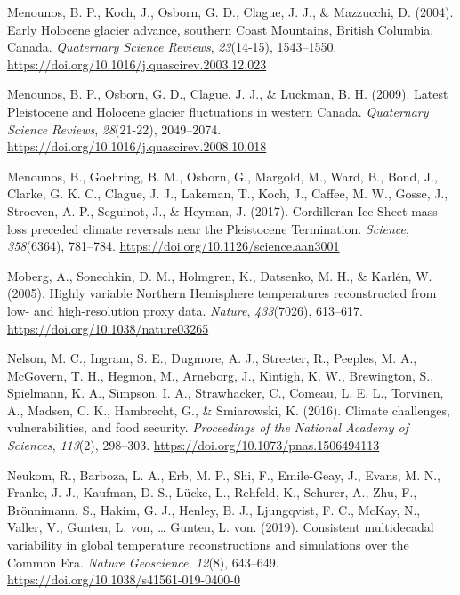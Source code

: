 \documentclass[
  letterpaper,
  DIV=11,
  numbers=noendperiod]{scrartcl}
\newlength{\cslhangindent}
\newlength{\cslentryspacingunit} %
\newenvironment{CSLReferences}[2] %
 {%
  \setlength{\parindent}{0pt}
  \ifodd #1
  \let\oldpar\par
  \def\par{\hangindent=\cslhangindent\oldpar}
  \fi
  \setlength{\parskip}{#2\cslentryspacingunit}
 }%
 {}
\begin{document}
\begin{CSLReferences}{1}{0}
\leavevmode{}%
Menounos, B. P., Koch, J., Osborn, G. D., Clague, J. J., \& Mazzucchi,
D. (2004). {Early Holocene glacier advance, southern Coast Mountains,
British Columbia, Canada}. \emph{Quaternary Science Reviews},
\emph{23}(14-15), 1543--1550.
\url{https://doi.org/10.1016/j.quascirev.2003.12.023}

\leavevmode{}%
Menounos, B. P., Osborn, G. D., Clague, J. J., \& Luckman, B. H. (2009).
{Latest Pleistocene and Holocene glacier fluctuations in western
Canada}. \emph{Quaternary Science Reviews}, \emph{28}(21-22),
2049--2074. \url{https://doi.org/10.1016/j.quascirev.2008.10.018}

\leavevmode{}%
Menounos, B., Goehring, B. M., Osborn, G., Margold, M., Ward, B., Bond,
J., Clarke, G. K. C., Clague, J. J., Lakeman, T., Koch, J., Caffee, M.
W., Gosse, J., Stroeven, A. P., Seguinot, J., \& Heyman, J. (2017).
{Cordilleran Ice Sheet mass loss preceded climate reversals near the
Pleistocene Termination}. \emph{Science}, \emph{358}(6364), 781--784.
\url{https://doi.org/10.1126/science.aan3001}

\leavevmode{}%
Moberg, A., Sonechkin, D. M., Holmgren, K., Datsenko, M. H., \& Karlén,
W. (2005). {Highly variable Northern Hemisphere temperatures
reconstructed from low- and high-resolution proxy data}. \emph{Nature},
\emph{433}(7026), 613--617. \url{https://doi.org/10.1038/nature03265}

\leavevmode{}%
Nelson, M. C., Ingram, S. E., Dugmore, A. J., Streeter, R., Peeples, M.
A., McGovern, T. H., Hegmon, M., Arneborg, J., Kintigh, K. W.,
Brewington, S., Spielmann, K. A., Simpson, I. A., Strawhacker, C.,
Comeau, L. E. L., Torvinen, A., Madsen, C. K., Hambrecht, G., \&
Smiarowski, K. (2016). {Climate challenges, vulnerabilities, and food
security}. \emph{Proceedings of the National Academy of Sciences},
\emph{113}(2), 298--303. \url{https://doi.org/10.1073/pnas.1506494113}

\leavevmode{}%
Neukom, R., Barboza, L. A., Erb, M. P., Shi, F., Emile-Geay, J., Evans,
M. N., Franke, J. J., Kaufman, D. S., Lücke, L., Rehfeld, K., Schurer,
A., Zhu, F., Brönnimann, S., Hakim, G. J., Henley, B. J., Ljungqvist, F.
C., McKay, N., Valler, V., Gunten, L. von, \ldots{} Gunten, L. von.
(2019). {Consistent multidecadal variability in global temperature
reconstructions and simulations over the Common Era}. \emph{Nature
Geoscience}, \emph{12}(8), 643--649.
\url{https://doi.org/10.1038/s41561-019-0400-0}


\end{CSLReferences}
\end{document}
